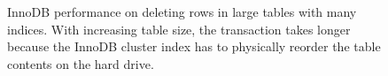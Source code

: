 \begin{figure}[h]
	\centering
	\def\svgwidth{0.4\textwidth}
	
	\caption[Deletion time on large InnoDB tables]{
		InnoDB performance on deleting rows in large tables with many indices. With
		increasing table size, the transaction takes longer because the InnoDB
		cluster index has to physically reorder the table contents on the hard
		drive.
	}
	\label{fig:delete-time}
\end{figure}
